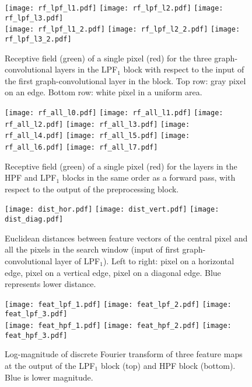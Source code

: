 \documentclass[journal]{IEEEtran}
\begin{document}
\begin{figure}
\centering
\texttt{[image: rf\_lpf\_l1.pdf]}
\texttt{[image: rf\_lpf\_l2.pdf]}
\texttt{[image: rf\_lpf\_l3.pdf]}
\\[6pt]
\texttt{[image: rf\_lpf\_l1\_2.pdf]}
\texttt{[image: rf\_lpf\_l2\_2.pdf]}
\texttt{[image: rf\_lpf\_l3\_2.pdf]}
\caption{Receptive field (green) of a single pixel (red) for the three graph-convolutional layers in the LPF$_1$ block with respect to the input of the first graph-convolutional layer in the block. Top row: gray pixel on an edge. Bottom row: white pixel in a uniform area.}
\label{fig:recfield}
\end{figure}

\begin{figure*}
\centering
\texttt{[image: rf\_all\_l0.pdf]}
\texttt{[image: rf\_all\_l1.pdf]}
\texttt{[image: rf\_all\_l2.pdf]}
\texttt{[image: rf\_all\_l3.pdf]}
\texttt{[image: rf\_all\_l4.pdf]}
\texttt{[image: rf\_all\_l5.pdf]}
\texttt{[image: rf\_all\_l6.pdf]}
\texttt{[image: rf\_all\_l7.pdf]}
\caption{Receptive field (green) of a single pixel (red) for the layers in the HPF and LPF$_1$ blocks in the same order as a forward pass, with respect to the output of the preprocessing block.}
\label{fig:recfield_long}
\end{figure*}
\begin{figure}
\centering
\texttt{[image: dist\_hor.pdf]}
\texttt{[image: dist\_vert.pdf]}
\texttt{[image: dist\_diag.pdf]}
\caption{Euclidean distances between feature vectors of the central pixel and all the pixels in the search window (input of first graph-convolutional layer of LPF$_1$). Left to right: pixel on a horizontal edge, pixel on a vertical edge, pixel on a diagonal edge. Blue represents lower distance.}
\label{fig:dir}
\end{figure}

\begin{figure}
\centering
\texttt{[image: feat\_lpf\_1.pdf]}
\texttt{[image: feat\_lpf\_2.pdf]}
\texttt{[image: feat\_lpf\_3.pdf]}
\\[6pt]
\texttt{[image: feat\_hpf\_1.pdf]}
\texttt{[image: feat\_hpf\_2.pdf]}
\texttt{[image: feat\_hpf\_3.pdf]}
\caption{Log-magnitude of discrete Fourier transform of three feature maps at the output of the LPF$_1$ block (top) and HPF block (bottom). Blue is lower magnitude.}
\label{fig:filters}
\end{figure}
\end{document}
